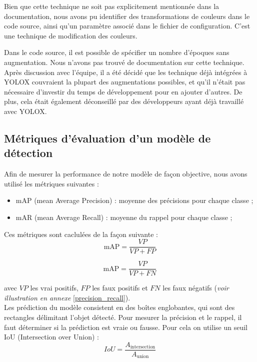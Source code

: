 Bien que cette technique ne soit pas explicitement mentionnée dans la documentation,
nous avons pu identifier des transformations de couleurs dans le code source, 
ainsi qu'un paramètre associé dans le fichier de configuration.
C'est une technique de modification des couleurs.

Dans le code source, il est possible de spécifier un nombre d'époques sans augmentation.
Nous n'avons pas trouvé de documentation sur cette technique.\\

Après discussion avec l'équipe, il a été décidé que les technique déjà intégrées à YOLOX
couvraient la plupart des augmentations possibles, et qu'il n'était pas nécessaire d'investir 
du temps de développement pour en ajouter d'autres. De plus, cela était également déconseillé
par des développeurs ayant déjà travaillé avec YOLOX.\\

\subsection{Métriques d'évaluation d'un modèle de détection}

Afin de mesurer la performance de notre modèle de façon objective, 
nous avons utilisé les métriques suivantes : 
\begin{itemize}
    \item mAP (mean Average Precision) : moyenne des précisions pour chaque classe ; 
    \item mAR (mean Average Recall) : moyenne du rappel pour chaque classe ;
\end{itemize}

Ces métriques sont caclulées de la façon suivante :\\

$$
\text{mAP} = \frac{VP}{VP + FP}
$$

$$
\text{mAP} = \frac{VP}{VP + FN}
$$

avec $VP$ les vrai positifs, $FP$ les faux positifs et $FN$ les faux négatifs (\textit{voir illustration en annexe }
\ref{precision_recall}).\\

Les prédiction du modèle consistent en des boîtes englobantes, qui sont des rectangles délimitant
l'objet détecté. Pour mesurer la précision et le rappel, il faut déterminer si la prédiction
est vraie ou fausse. Pour cela on utilise un seuil IoU (Intersection over Union) :
\[
    IoU = \frac{A_{\text{intersection}}}{A_{\text{union}}}
\]

